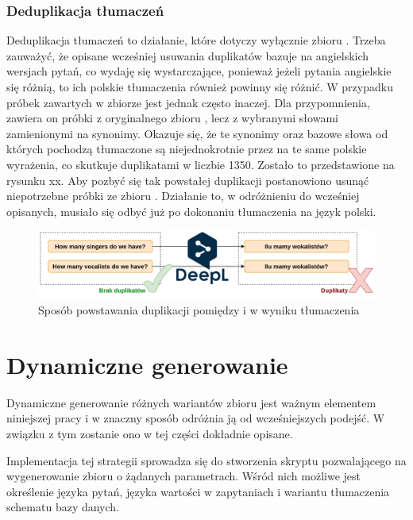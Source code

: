 \subsubsection{Deduplikacja tłumaczeń}
Deduplikacja tłumaczeń to działanie, które dotyczy wyłącznie zbioru . Trzeba zauważyć, że opisane wcześniej usuwania duplikatów bazuje na angielskich wersjach pytań, co wydaję się wystarczające, ponieważ jeżeli pytania angielskie się różnią, to ich polskie tłumaczenia również powinny się różnić. W przypadku próbek zawartych w zbiorze  jest jednak często inaczej. Dla przypomnienia, zawiera on próbki z oryginalnego zbioru , lecz z wybranymi słowami zamienionymi na synonimy. Okazuje się, że te synonimy oraz bazowe słowa od których pochodzą tłumaczone są niejednokrotnie przez  na te same polskie wyrażenia, co skutkuje duplikatami w liczbie 1350. Zostało to przedstawione na rysunku xx. Aby pozbyć się tak powstałej duplikacji postanowiono usunąć niepotrzebne próbki ze zbioru . Działanie to, w odróżnieniu do wcześniej opisanych, musiało się odbyć już po dokonaniu tłumaczenia na język polski.

\begin{figure}[ht!]
  \centering
  \includegraphics[width=1.0\linewidth]{images/duplication_after_translation.png}
  \caption{Sposób powstawania duplikacji pomiędzy  i  w wyniku tłumaczenia}
  \label{fig:deduplication_after_translation}
\end{figure}

\section{Dynamiczne generowanie}
Dynamiczne generowanie różnych wariantów zbioru jest ważnym elementem niniejszej pracy i w znaczny sposób odróżnia ją od wcześniejszych podejść. W związku z tym zostanie ono w tej części dokładnie opisane.

Implementacja tej strategii sprowadza się do stworzenia skryptu pozwalającego na wygenerowanie zbioru o żądanych parametrach. Wśród nich możliwe jest określenie języka pytań, języka wartości w zapytaniach i wariantu tłumaczenia schematu bazy danych.

